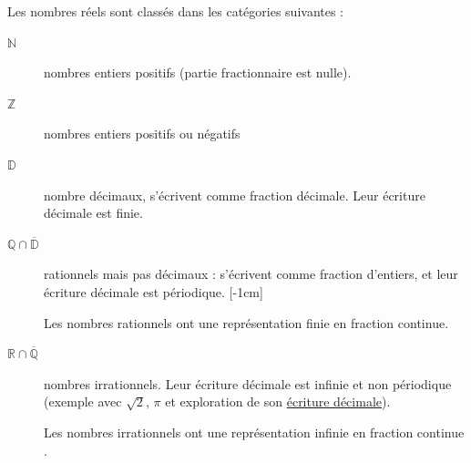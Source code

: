\documentclass[main.tex]{subfiles}
\begin{document}
\begin{definition} 
		Les nombres réels sont classés dans les catégories suivantes :
		\begin{description}
			\item[$\mathbb{N}$] nombres entiers positifs (partie fractionnaire est nulle).
			\item[$\mathbb{Z}$] nombres entiers positifs ou négatifs
			\item[$\mathbb{D}$] nombre décimaux, s'écrivent comme fraction décimale. Leur écriture décimale est finie.
			\item[$\mathbb{Q}\cap\overline{\mathbb{D}}$] rationnels mais pas décimaux : s'écrivent comme fraction d'entiers, et leur écriture décimale est périodique.
			[-1cm] 
		
			Les nombres rationnels ont une représentation finie en fraction continue.
			\item[$\mathbb{R}\cap\overline{\mathbb{Q}}$] nombres irrationnels. Leur écriture décimale est infinie et non périodique (exemple avec $\sqrt{2}$, $\pi$ et exploration de son  \hyperlink{https://math.fit/pi-digits}{écriture décimale}).
			
			Les nombres irrationnels ont une représentation infinie en fraction continue .
		\end{description}  
\end{definition}
\end{document}
